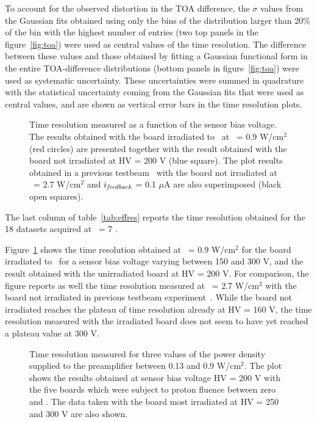 		To account for the observed distortion in the TOA difference, the $\sigma$ values from the Gaussian fits obtained using only the bins of the distribution larger than 20\% of the  bin with the highest number of entries (two top panels in the figure~\ref{fig:toa}) were used as central values of the  time resolution.
		The difference between these values and those obtained by fitting a Gaussian functional form in the entire TOA-difference distributions (bottom panels in figure~\ref{fig:toa}) were used as systematic uncertainty. These uncertainties were summed in quadrature with the statistical uncertainty coming from the Gaussian fits that were used as central values, and are shown as vertical error bars in the  time resolution plots.


		\begin{figure}[!htb]
			\centering
			\caption{\label{fig:HV_vs_timeres} Time resolution measured as a function of the sensor bias voltage. The results obtained with the board irradiated to \maxflu~at \pdensity~= 0.9 W/cm$^2$ (red circles) are presented together with the result obtained with the board not irradiated at HV = 200 V (blue square). The plot results obtained in a previous testbeam~\cite{Zambito_2023} with the board not irradiated at \pdensity~= 2.7 W/cm$^2$ and  $i_{\it feedback}$ = 0.1 $\mu$A are also superimposed (black open squares).}
		\end{figure}



		The last column of table~\ref{tab:effres} reports the time resolution obtained for the 18 datasets acquired at \vth~= 7 \sigmav.  


		Figure~\ref{fig:HV_vs_timeres} shows the time resolution obtained at \pdensity~= 0.9 W/cm$^2$ for the board irradiated to \maxflu~for a sensor bias voltage varying between 150 and 300 V, and the result obtained with the unirradiated board at HV = 200 V.
		For comparison, the figure reports as well the time resolution measured at \pdensity~= 2.7 W/cm$^2$ with the board not irradiated in  previous testbeam experiment~\cite{Zambito_2023}.
		While the board not irradiated reaches the plateau of time resolution already at HV = 160 V, the time resolution measured with the irradiated board does not seem to have yet reached a plateau value at 300 V.



		\begin{figure}[!htb]
			\centering
			\caption{\label{fig:power_vs_timeres}Time resolution measured for three values of the  power density supplied to the preamplifier between 0.13 and 0.9 W/cm$^2$. The plot shows the results obtained at sensor bias voltage HV = 200 V with the five boards which were subject to proton fluence between zero and \maxflu. The data taken with the board most irradiated  at HV = 250 and 300 V are also shown.}
		\end{figure}

